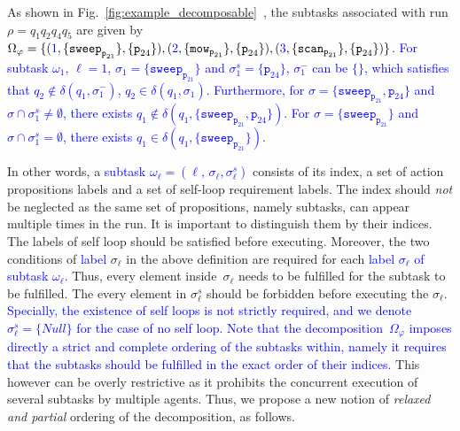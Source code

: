 \begin{example}
	\label{example:subtask}
        As shown in Fig.~\ref{fig:example_decomposable}~,
          the subtasks associated with run $\rho=q_1q_2q_4q_5$ are given
          by~$\Omega_\varphi=\{(\textcolor{blue}{1},\{\texttt{sweep}_{\texttt{p}_{21}}\},\{\texttt{p}_{24}\}),
         \\ (\textcolor{blue}{2},\{\texttt{mow}_{\texttt{p}_{21}}\}, \{\texttt{p}_{24}\}),
          (\textcolor{blue}{3}, \{\texttt{scan}_{\texttt{p}_{21}}\}, \{\texttt{p}_{24}\})\}$.
          \textcolor{blue}{For subtask $\omega_1$, $\ell=1$, $\sigma_1=\{\texttt{sweep}_{\texttt{p}_{21}}\}$ and $\sigma^s_1=\{\texttt{p}_{24}\}$,
          $\sigma^-_1$ can be $\{\}$, which satisfies that $q_2\notin
          \delta(q_1,\sigma^-_1)$, $q_2\in\delta(q_1,\sigma_1)$.
          Furthermore, for $\sigma=\{\texttt{sweep}_{\texttt{p}_{21}}, \texttt{p}_{24}\}$ and $\sigma\cap\sigma^s_1\neq\emptyset$, there exists $q_1\notin \delta(q_1, \{\texttt{sweep}_{\texttt{p}_{21}}, \texttt{p}_{24}\})$.
          For $\sigma=\{\texttt{sweep}_{\texttt{p}_{21}}\}$ and
          $\sigma\cap\sigma^s_1=\emptyset$, there exists $q_1\in \delta(q_1,\{\texttt{sweep}_{\texttt{p}_{21}}\})$.}
\end{example}

In other words, a \textcolor{blue}{subtask $\omega_\ell=(\ell,\,\sigma_\ell,\sigma^s_\ell)$} consists of its index, a set of action propositions labels and
a set of self-loop requirement labels.
The index should \emph{not} be neglected as the same set of propositions, namely subtasks,
can appear multiple times in the run.
It is important to distinguish them by their indices. The labels of self loop should be satisfied
before executing. Moreover, the two conditions of \textcolor{blue}{label} $\sigma_\ell$ in the above definition are required for 
each \textcolor{blue}{label $\sigma_\ell$ of subtask $\omega_\ell$}.
Thus, every element inside~$\sigma_\ell$ needs to be fulfilled for the subtask to be fulfilled.
The every element in $\sigma^s_\ell$ should be forbidden before
executing the $\sigma_\ell$. \textcolor{blue}{Specially, the
existence of self loops is not strictly required,
and we denote $\sigma^s_\ell=\{Null\}$ for the case
of no self loop.
Note that the decomposition~$\Omega_{\varphi}$ imposes directly a {strict and complete} ordering of the subtasks within,
namely it requires that the subtasks should be fulfilled in the exact order of their indices.}
This however can be overly restrictive as it prohibits the concurrent execution of several subtasks by multiple agents.
Thus, we propose a new notion of \emph{relaxed and partial} ordering of the decomposition,
as follows.

